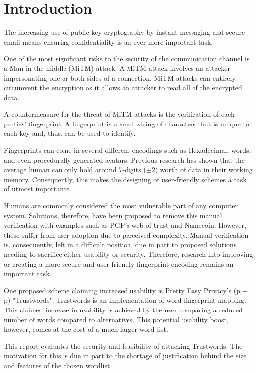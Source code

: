 \chapter{Introduction}
\label{cha:Introduction}

The increasing use of public-key cryptography by instant messaging and secure email means ensuring confidentiality is an ever more important task.

One of the most significant risks to the security of the communication channel is a Man-in-the-middle (MiTM) attack. A MiTM attack involves an attacker impersonating one or both sides of a connection. MiTM attacks can entirely circumvent the encryption as it allows an attacker to read all of the encrypted data. 

A countermeasure for the threat of MiTM attacks is the verification of each parties’ fingerprint. A fingerprint is a small string of characters that is unique to each key and, thus, can be used to identify.

Fingerprints can come in several different encodings such as Hexadecimal, words, and even procedurally generated avatars. Previous research has shown that the average human can only hold around 7-digits ($\pm 2$) worth of data in their working memory\cite{miller1956magical}. Consequently, this makes the designing of user-friendly schemes a task of utmost importance.

Humans are commonly considered the most vulnerable part of any computer system. Solutions, therefore, have been proposed to remove this manual verification with examples such as PGP's web-of-trust\cite{callas1998openpgp} and Namecoin\cite{kalodner2015empirical}. However, these suffer from user adoption due to perceived complexity. Manual verification is, consequently, left in a difficult position, due in part to proposed solutions needing to sacrifice either usability or security. Therefore, research into improving or creating a more secure and user-friendly fingerprint encoding remains an important task.

One proposed scheme claiming increased usability is Pretty Easy Privacy's (p$\equiv$p) "Trustwords". Trustwords is an implementation of word fingerprint mapping. This claimed increase in usability is achieved by the user comparing a reduced number of words compared to alternatives. This potential usability boost, however, comes at the cost of a much larger word list.

This report evaluates the security and feasibility of attacking Trustwords. The motivation for this is due in part to the shortage of justification behind the size and features of the chosen wordlist.

